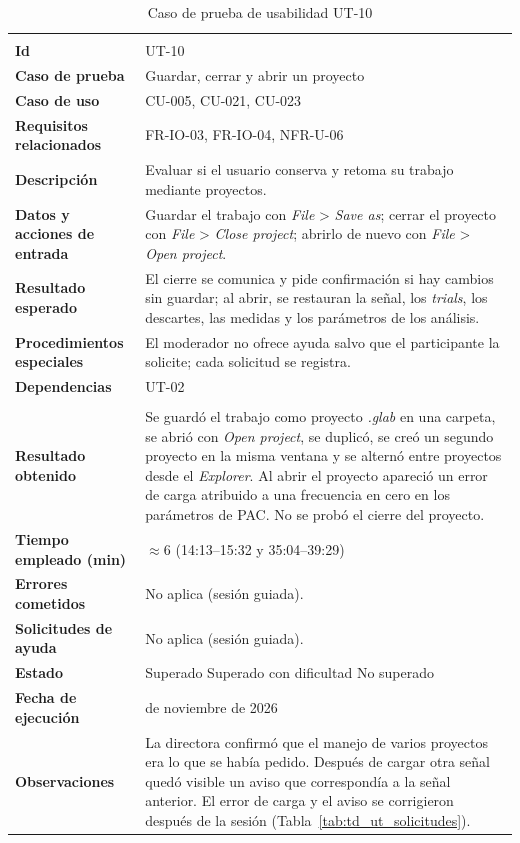\documentclass[12pt,letterpaper,oneside]{article}
\DeclareRobustCommand{\_}{\textunderscore\allowbreak}
\newcommand{\fechasesion}{12 de noviembre de 2026}
\newcommand{\casilla}[1]{%
    \fbox{\makebox[1em][c]{#1}}%
}
\begin{document}
\begin{center}
\small
\begin{longtable}{|>{\raggedright\arraybackslash}p{}|>{\raggedright\arraybackslash}p{}|}
\hline
\endfirsthead
\hline
\endhead
\hline
\endfoot
\hline
\caption{Caso de prueba de usabilidad UT-10} \label{tab:ut-10} \\
\endlastfoot
\textbf{Id} & UT-10 \\
\hline
\textbf{Caso de prueba} & Guardar, cerrar y abrir un proyecto \\
\hline
\textbf{Caso de uso} & CU-005, CU-021, CU-023 \\
\hline
\textbf{Requisitos relacionados} & FR-IO-03, FR-IO-04, NFR-U-06 \\
\hline
\textbf{Descripción} & Evaluar si el usuario conserva y retoma su trabajo mediante proyectos. \\
\hline
\textbf{Datos y acciones de entrada} & Guardar el trabajo con \textit{File} > \textit{Save as}; cerrar el proyecto con \textit{File} > \textit{Close project}; abrirlo de nuevo con \textit{File} > \textit{Open project}. \\
\hline
\textbf{Resultado esperado} & El cierre se comunica y pide confirmación si hay cambios sin guardar; al abrir, se restauran la señal, los \textit{trials}, los descartes, las medidas y los parámetros de los análisis. \\
\hline
\textbf{Procedimientos especiales} & El moderador no ofrece ayuda salvo que el participante la solicite; cada solicitud se registra. \\
\hline
\textbf{Dependencias} & UT-02 \\
\hline
\multicolumn{2}{|c|}{\textbf{Información para el seguimiento}} \\
\hline
\textbf{Resultado obtenido} & Se guardó el trabajo como proyecto \textit{.glab} en una carpeta, se abrió con \textit{Open project}, se duplicó, se creó un segundo proyecto en la misma ventana y se alternó entre proyectos desde el \textit{Explorer}. Al abrir el proyecto apareció un error de carga atribuido a una frecuencia en cero en los parámetros de PAC. No se probó el cierre del proyecto. \\
\hline
\textbf{Tiempo empleado (min)} & $\approx$6 (14:13--15:32 y 35:04--39:29) \\
\hline
\textbf{Errores cometidos} & No aplica (sesión guiada). \\
\hline
\textbf{Solicitudes de ayuda} & No aplica (sesión guiada). \\
\hline
\textbf{Estado} & \casilla{} Superado \qquad \casilla{x} Superado con dificultad \qquad \casilla{} No superado \\
\hline
\textbf{Fecha de ejecución} & \fechasesion \\
\hline
\textbf{Observaciones} & La directora confirmó que el manejo de varios proyectos era lo que se había pedido. Después de cargar otra señal quedó visible un aviso que correspondía a la señal anterior. El error de carga y el aviso se corrigieron después de la sesión (Tabla~\ref{tab:td_ut_solicitudes}). \\
\hline
\end{longtable}
\end{center}
\end{document}
